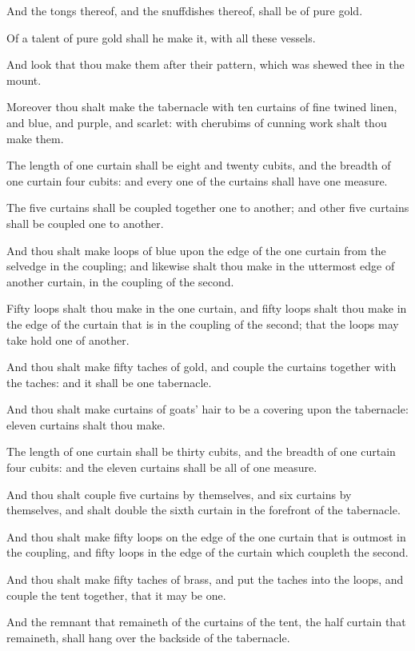\Verse And the tongs thereof, and the snuffdishes thereof, shall be of pure gold.

\Verse Of a talent of pure gold shall he make it, with all these vessels.

\Verse And look that thou make them after their pattern, which was shewed thee in the mount.

\Chapter
\Verse Moreover thou shalt make the tabernacle with ten curtains of fine twined linen, and blue, and purple, and scarlet: with cherubims of cunning work shalt thou make them.

\Verse The length of one curtain shall be eight and twenty cubits, and the breadth of one curtain four cubits: and every one of the curtains shall have one measure.

\Verse The five curtains shall be coupled together one to another; and other five curtains shall be coupled one to another.

\Verse And thou shalt make loops of blue upon the edge of the one curtain from the selvedge in the coupling; and likewise shalt thou make in the uttermost edge of another curtain, in the coupling of the second.

\Verse Fifty loops shalt thou make in the one curtain, and fifty loops shalt thou make in the edge of the curtain that is in the coupling of the second; that the loops may take hold one of another.

\Verse And thou shalt make fifty taches of gold, and couple the curtains together with the taches: and it shall be one tabernacle.

\Verse And thou shalt make curtains of goats' hair to be a covering upon the tabernacle: eleven curtains shalt thou make.

\Verse The length of one curtain shall be thirty cubits, and the breadth of one curtain four cubits: and the eleven curtains shall be all of one measure.

\Verse And thou shalt couple five curtains by themselves, and six curtains by themselves, and shalt double the sixth curtain in the forefront of the tabernacle.

\Verse And thou shalt make fifty loops on the edge of the one curtain that is outmost in the coupling, and fifty loops in the edge of the curtain which coupleth the second.

\Verse And thou shalt make fifty taches of brass, and put the taches into the loops, and couple the tent together, that it may be one.

\Verse And the remnant that remaineth of the curtains of the tent, the half curtain that remaineth, shall hang over the backside of the tabernacle.

